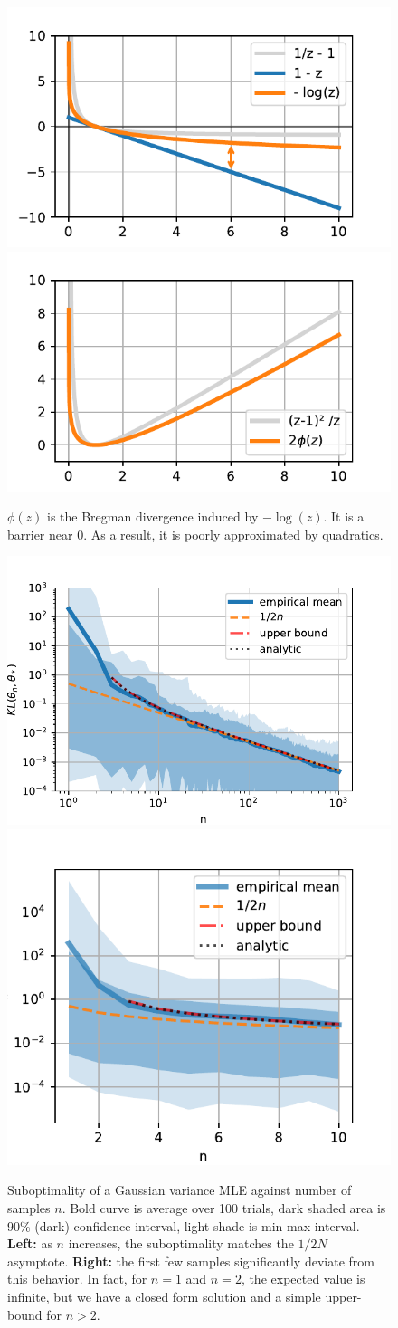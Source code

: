 \documentclass[twoside]{article}
\begin{document}
\begin{figure}[ht]
	\centering
	\includegraphics[width=.4\textwidth]{bregmandef.pdf}
	\includegraphics[width=.4\textwidth]{phi.pdf}
	\caption{$\phi(z)$ is the Bregman divergence induced by $-\log(z)$. It is a barrier near $0$. As a result, it is poorly approximated by quadratics.}
	\label{fig:phi}
\end{figure}

\begin{figure}[ht]
	\centering
\includegraphics[width=.48\textwidth]{asymptote.pdf}
\includegraphics[width=.48\textwidth]{fewsamples.pdf}
	\caption{Suboptimality of a Gaussian variance MLE against number of samples $n$. Bold curve is average over 100 trials,  dark shaded area is 90\% (dark) confidence interval, light shade is min-max interval.  
	\textbf{Left:} as $n$ increases, the suboptimality matches the $1/2N$ asymptote.
	\textbf{Right:} the first few samples significantly deviate from this behavior. In fact, for $n=1$ and $n=2$, the expected value is infinite, but we have a closed form solution and a simple upper-bound for $n>2$.
	}
	\label{fig:curves}
\end{figure}
\end{document}
